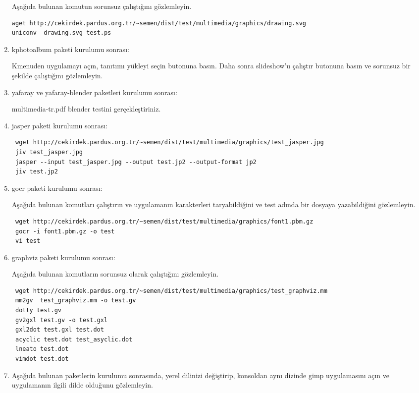 \documentclass[a4paper,10pt]{article}
\begin{document}
\begin{enumerate}
Aşağıda bulunan komutun sorunsuz çalıştığını gözlemleyin.
\begin{verbatim}
wget http://cekirdek.pardus.org.tr/~semen/dist/test/multimedia/graphics/drawing.svg
uniconv  drawing.svg test.ps
\end{verbatim}


\item kphotoalbum paketi kurulumu sonrası:

Kmenuden uygulamayı açın, tanıtımı yükleyi seçin butonuna basın. Daha sonra slideshow'u çalıştır butonuna basın ve sorunsuz bir şekilde çalıştığını gözlemleyin.

\item yafaray ve yafaray-blender paketleri kurulumu sonrası:

multimedia-tr.pdf blender testini gerçekleştiriniz.
\item jasper paketi kurulumu sonrası:

\begin{verbatim}
 wget http://cekirdek.pardus.org.tr/~semen/dist/test/multimedia/graphics/test_jasper.jpg
 jiv test_jasper.jpg
 jasper --input test_jasper.jpg --output test.jp2 --output-format jp2
 jiv test.jp2
\end{verbatim}


 \item gocr paketi kurulumu sonrası:

Aşağıda bulunan komutları çalıştırın ve uygulamanın karakterleri taryabildiğini ve test adında bir dosyaya yazabildiğini gözlemleyin.
\begin{verbatim}
 wget http://cekirdek.pardus.org.tr/~semen/dist/test/multimedia/graphics/font1.pbm.gz
 gocr -i font1.pbm.gz -o test
 vi test
\end{verbatim}

\item graphviz paketi kurulumu sonrası:

Aşağıda bulunan komutların sorunsuz olarak çalıştığını gözlemleyin.
\begin{verbatim}
 wget http://cekirdek.pardus.org.tr/~semen/dist/test/multimedia/graphics/test_graphviz.mm
 mm2gv  test_graphviz.mm -o test.gv
 dotty test.gv
 gv2gxl test.gv -o test.gxl
 gxl2dot test.gxl test.dot
 acyclic test.dot test_asyclic.dot
 lneato test.dot
 vimdot test.dot
\end{verbatim}

 \item Aşağıda bulunan paketlerin kurulumu sonrasında, yerel dilinizi değiştirip, konsoldan aynı dizinde gimp uygulamasını açın ve uygulamanın ilgili dilde olduğunu gözlemleyin.


\end{enumerate}
\end{document}
